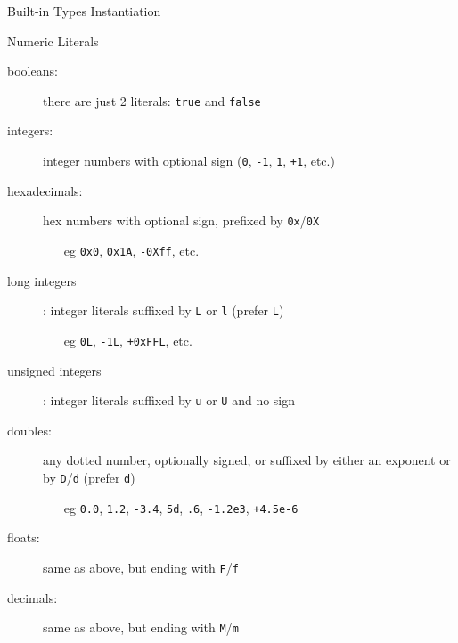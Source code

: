 \documentclass[presentation]{beamer}
\newcommand{\literal}[1]{\texttt{\alert{#1}}}
\begin{document}
\begin{frame}[allowframebreaks]{Built-in Types Instantiation}
    \begin{exampleblock}{Numeric Literals}
        \begin{description}
            \item[booleans:] there are just 2 literals: \literal{true} and \literal{false}
            
            \item[integers:] integer numbers with optional sign (\literal{0}, \literal{-1}, \literal{1}, \literal{+1}, etc.)

            \item[hexadecimals:] hex numbers with optional sign, prefixed by \literal{0x}/\literal{0X}
            \begin{itemize}
                \item[eg] \literal{0x0}, \literal{0x1A}, \literal{-0Xff}, etc.
            \end{itemize} 

            \item[long integers]: integer literals suffixed by \literal{L} or \literal{l} (prefer \texttt{L})
            \begin{itemize}
                \item[eg] \literal{0L}, \literal{-1L}, \literal{+0xFFL}, etc.
            \end{itemize}  

            \item[unsigned integers]: integer literals suffixed by \literal{u} or \literal{U} and no sign
            
            \item[doubles:] any dotted number, optionally signed, or suffixed by either an exponent or by \literal{D}/\literal{d} (prefer \texttt{d})
            \begin{itemize}
                \item[eg] \literal{0.0}, \literal{1.2}, \literal{-3.4}, \literal{5d}, \literal{.6}, \literal{-1.2e3}, \literal{+4.5e-6}
            \end{itemize}   
            
            \item[floats:] same as above, but ending with \literal{F}/\literal{f}
            
            \item[decimals:] same as above, but ending with \literal{M}/\literal{m}
        \end{description}
    \end{exampleblock}


\end{frame}
\end{document}
